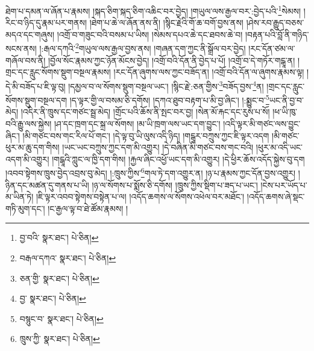 ཐེག་པ་དམན་ལ་ཞོན་པ་རྣམས། །སྐད་ཅིག་སྐད་ཅིག་འཆིང་བར་བྱེད། །གཡུལ་ལས་རྒྱལ་བར་:བྱེད་པའི་\footnote{བྱ་བའི་  སྣར་ཐང་།  པེ་ཅིན། }སེམས། །རིང་བ་ཉིད་དུ་རྣམ་པར་གནས། །ཐེག་པ་ཆེ་ལ་ཞོན་ནས་ནི། །སྙིང་རྗེའི་གོ་ཆ་བགོ་བྱས་ནས། །ཤེས་རབ་རྒྱུད་བཅས་མདའ་དང་གཞུས། །འགྲོ་བ་གཟུང་བའི་བསམ་པ་ཡིས། །སེམས་དཔའ་ཆེ་དང་ཐབས་ཆེ་བ། །བརྟན་པའི་བློ་ནི་གཉིད་སངས་ནས། །:རྒལ་དཀའི་\footnote{བརྒལ་དཀའ་  སྣར་ཐང་།  པེ་ཅིན། }གཡུལ་ལས་རྒྱལ་བྱས་ནས། །གཞན་དག་ཀྱང་ནི་སྒྲོལ་བར་བྱེད། །རང་དོན་ཙམ་ལ་གཞོལ་བས་ནི། །བྱོལ་སོང་རྣམས་ཀྱང་ཉོན་མོངས་བྱེད། །འགྲོ་བའི་དོན་ནི་བྱེད་པ་པོ། །འགྲོ་བ་དེ་གཏོར་གངྒཱ་ན། །གྲང་དང་རླུང་སོགས་སྡུག་བསྔལ་རྣམས། །རང་དོན་ཞུགས་ལས་ཀྱང་བཟོད་ན། །འགྲོ་བའི་དོན་ལ་ཞུགས་རྣམས་ལྟ། །དེ་མི་བཟོད་པ་ཇི་ལྟ་བུ། །དམྱལ་བ་ལ་སོགས་སྡུག་བསྔལ་ཡང་། །སྙིང་རྗེ་:ཅན་གྱིས་\footnote{ཅན་གྱི་  སྣར་ཐང་།  པེ་ཅིན། }བཟོད་བྱས་\footnote{བྱ་  སྣར་ཐང་།  པེ་ཅིན། }ན། །གྲང་དང་རླུང་སོགས་སྡུག་བསྔལ་དག །ད་ལྟར་གྱི་ལ་བསམ་ཅི་དགོས། །དཀའ་ཐུབ་བརྟག་པ་མི་བྱ་ཞིང་། །:སྨྱུང་བ་\footnote{བསྙུང་བ་  སྣར་ཐང་།  པེ་ཅིན། }ཡང་ནི་བྱ་བ་མེད། །འདིར་ནི་ཁྲུས་དང་གཙང་སྦྲ་མེད། །གྲོང་པའི་ཆོས་ནི་སྤང་བར་བྱ། །སེན་མོ་རྐང་དང་རུས་པ་སོ། །ཕ་ཡི་ཁུ་བའི་རྒྱུ་ལས་སྐྱེས། །ཤ་དང་ཁྲག་དང་སྐྲ་ལ་སོགས། །མ་ཡི་ཁྲག་ལས་ཡང་དག་བྱུང་། །འདི་ལྟར་མི་གཙང་ལས་བྱུང་ཞིང་། །མི་གཙང་བས་གང་རིལ་པོ་གང་། །དེ་ལྟ་བུ་ཡི་ལུས་འདི་ཉིད། །གངྒཱར་བཀྲུས་ཀྱང་ཇི་ལྟར་འདག །མི་གཙང་ཕུར་མ་ཆུ་དག་གིས། །ཡང་ཡང་བཀྲུས་ཀྱང་དག་མི་འགྱུར། །དེ་བཞིན་མི་གཙང་བས་གང་བའི། །ཕུར་མ་འདི་ཡང་འདག་མི་འགྱུར། །གངྒཱའི་ཀླུང་ལ་ཁྱི་དག་གིས། །རྐྱལ་ཞིང་འཕྱོ་ཡང་དག་མི་འགྱུར། །དེ་ཕྱིར་ཆོས་འདོད་སྐྱེས་བུ་དག །འབབ་སྟེགས་ཁྲུས་བྱེད་འབྲས་བུ་མེད། །:ཁྲུས་ཀྱིས་\footnote{ཁྲུས་ཀྱི་  སྣར་ཐང་།  པེ་ཅིན། }གལ་ཏེ་དག་འགྱུར་ན། །ཉ་པ་རྣམས་ཀྱང་དོན་བྱས་འགྱུར། །ཉིན་དང་མཚན་དུ་གནས་པ་ཡི། །ཉ་ལ་སོགས་པ་སྨོས་ཅི་དགོས། །ཁྲུས་ཀྱིས་སྡིག་པ་ཟད་པ་ཡང་། །ངེས་པར་ཡོད་པ་མ་ཡིན་ཏེ། །ཇི་ལྟར་འབབ་སྟེགས་བསྟེན་པ་ལ། །འདོད་ཆགས་ལ་སོགས་འཕེལ་བར་མཐོང་། །འདོད་ཆགས་ཞེ་སྡང་གཏི་མུག་དང་། །ང་རྒྱལ་ལྟ་བ་ཐེ་ཚོམ་རྣམས། །
